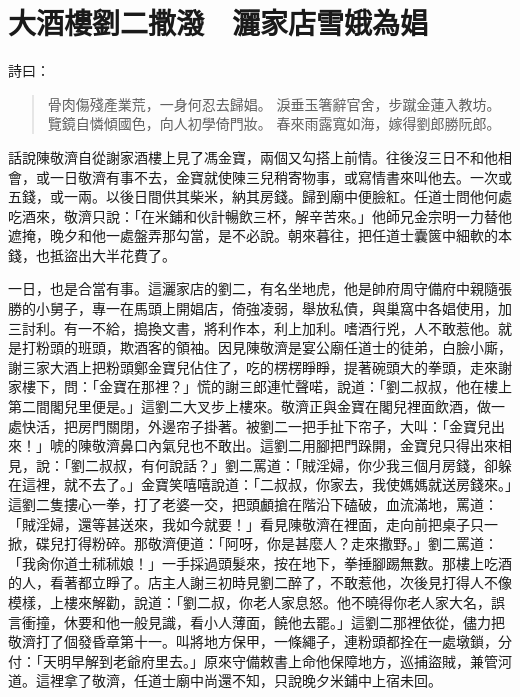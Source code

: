 
\chapter{大酒樓劉二撒潑　灑家店雪娥為娼}

詩曰：
\begin{quote}
骨肉傷殘產業荒，一身何忍去歸娼。
淚垂玉箸辭官舍，步蹴金蓮入教坊。
覽鏡自憐傾國色，向人初學倚門妝。
春來雨露寬如海，嫁得劉郎勝阮郎。
\end{quote}

話說陳敬濟自從謝家酒樓上見了馮金寶，兩個又勾搭上前情。往後沒三日不和他相會，或一日敬濟有事不去，金寶就使陳三兒稍寄物事，或寫情書來叫他去。一次或五錢，或一兩。以後日間供其柴米，納其房錢。歸到廟中便臉紅。任道士問他何處吃酒來，敬濟只說：「在米鋪和伙計暢飲三杯，解辛苦來。」他師兄金宗明一力替他遮掩，晚夕和他一處盤弄那勾當，是不必說。朝來暮往，把任道士囊篋中細軟的本錢，也抵盜出大半花費了。

一日，也是合當有事。這灑家店的劉二，有名坐地虎，他是帥府周守備府中親隨張勝的小舅子，專一在馬頭上開娼店，倚強凌弱，舉放私債，與巢窩中各娼使用，加三討利。有一不給，搗換文書，將利作本，利上加利。嗜酒行兇，人不敢惹他。就是打粉頭的班頭，欺酒客的領袖。因見陳敬濟是宴公廟任道士的徒弟，白臉小廝，謝三家大酒上把粉頭鄭金寶兒佔住了，吃的楞楞睜睜，提著碗頭大的拳頭，走來謝家樓下，問：「金寶在那裡？」慌的謝三郎連忙聲喏，說道：「劉二叔叔，他在樓上第二間閣兒里便是。」這劉二大叉步上樓來。敬濟正與金寶在閣兒裡面飲酒，做一處快活，把房門關閉，外邊帘子掛著。被劉二一把手扯下帘子，大叫：「金寶兒出來！」唬的陳敬濟鼻口內氣兒也不敢出。這劉二用腳把門跺開，金寶兒只得出來相見，說：「劉二叔叔，有何說話？」劉二罵道：「賊淫婦，你少我三個月房錢，卻躲在這裡，就不去了。」金寶笑嘻嘻說道：「二叔叔，你家去，我使媽媽就送房錢來。」這劉二隻摟心一拳，打了老婆一交，把頭顱搶在階沿下磕破，血流滿地，罵道：「賊淫婦，還等甚送來，我如今就要！」看見陳敬濟在裡面，走向前把桌子只一掀，碟兒打得粉碎。那敬濟便道：「阿呀，你是甚麼人？走來撒野。」劉二罵道：「我肏你道士秫秫娘！」一手採過頭髮來，按在地下，拳捶腳踢無數。那樓上吃酒的人，看著都立睜了。店主人謝三初時見劉二醉了，不敢惹他，次後見打得人不像模樣，上樓來解勸，說道：「劉二叔，你老人家息怒。他不曉得你老人家大名，誤言衝撞，休要和他一般見識，看小人薄面，饒他去罷。」這劉二那裡依從，儘力把敬濟打了個發昏章第十一。叫將地方保甲，一條繩子，連粉頭都拴在一處墩鎖，分付：「天明早解到老爺府里去。」原來守備敕書上命他保障地方，巡捕盜賊，兼管河道。這裡拿了敬濟，任道士廟中尚還不知，只說晚夕米鋪中上宿未回。

